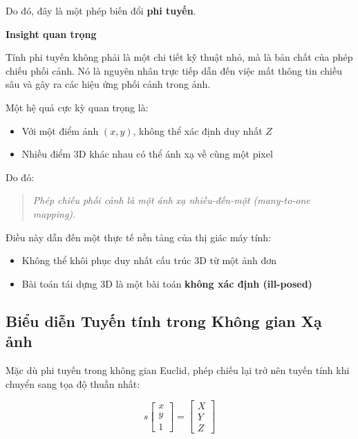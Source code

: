 Do đó, đây là một phép biến đổi \textbf{phi tuyến}.

\begin{mdframed}[style=infobox]
	\textbf{Insight quan trọng}
	
	Tính phi tuyến không phải là một chi tiết kỹ thuật nhỏ, mà là bản chất của phép chiếu phối cảnh. Nó là nguyên nhân trực tiếp dẫn đến việc mất thông tin chiều sâu và gây ra các hiệu ứng phối cảnh trong ảnh.
\end{mdframed}

Một hệ quả cực kỳ quan trọng là:

\begin{itemize}
	\item Với một điểm ảnh $(x, y)$, không thể xác định duy nhất $Z$
	\item Nhiều điểm 3D khác nhau có thể ánh xạ về cùng một pixel
\end{itemize}

Do đó:

\begin{quote}
	\textit{Phép chiếu phối cảnh là một ánh xạ nhiều-đến-một (many-to-one mapping).}
\end{quote}

Điều này dẫn đến một thực tế nền tảng của thị giác máy tính:

\begin{itemize}
	\item Không thể khôi phục duy nhất cấu trúc 3D từ một ảnh đơn
	\item Bài toán tái dựng 3D là một bài toán \textbf{không xác định (ill-posed)}
\end{itemize}

\subsection{Biểu diễn Tuyến tính trong Không gian Xạ ảnh}
\label{subsec:projective_representation}

Mặc dù phi tuyến trong không gian Euclid, phép chiếu lại trở nên tuyến tính khi chuyển sang tọa độ thuần nhất:

\[
s
\begin{bmatrix}
	x \\
	y \\
	1
\end{bmatrix}
=
\begin{bmatrix}
	X \\
	Y \\
	Z
\end{bmatrix}
\]

